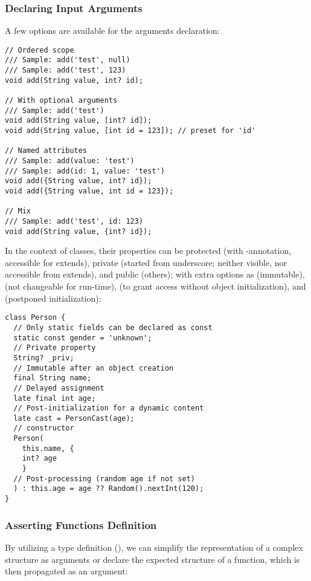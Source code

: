 \subsubsection{Declaring Input Arguments}

A few options are available for the arguments declaration:

\begin{lstlisting}
// Ordered scope
/// Sample: add('test', null) 
/// Sample: add('test', 123) 
void add(String value, int? id);

// With optional arguments
/// Sample: add('test')
void add(String value, [int? id]);
void add(String value, [int id = 123]); // preset for 'id'

// Named attributes
/// Sample: add(value: 'test')
/// Sample: add(id: 1, value: 'test')
void add({String value, int? id});
void add({String value, int id = 123});

// Mix
/// Sample: add('test', id: 123)
void add(String value, {int? id});
\end{lstlisting}

\noindent In the context of classes, their properties can be protected (with -annotation, accessible for 
extends), private (started from underscore; neither visible, nor accessible from extends), and public (others); 
with extra options as  (immutable),  (not changeable for run-time),  (to 
grant access without object initialization), and  (postponed initialization):

\begin{lstlisting}
class Person {
  // Only static fields can be declared as const
  static const gender = 'unknown';
  // Private property
  String? _priv;
  // Immutable after an object creation
  final String name;
  // Delayed assignment
  late final int age;
  // Post-initialization for a dynamic content
  late cast = PersonCast(age);
  // constructor
  Person(
    this.name, {
    int? age
    }
  // Post-processing (random age if not set)
  ) : this.age = age ?? Random().nextInt(120);
}
\end{lstlisting}


\subsubsection{Asserting Functions Definition}

By utilizing a type definition (), we can simplify the representation of a complex structure as arguments or 
declare the expected structure of a function, which is then propagated as an argument:


